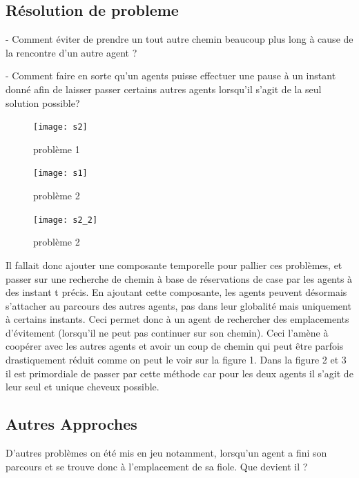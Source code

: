 \documentclass{article}
\begin{document}
\subsection{Résolution de probleme}


 - Comment éviter de prendre un tout autre chemin beaucoup plus long à cause de la rencontre d’un autre agent ?

 - Comment faire en sorte qu’un agents puisse effectuer une pause à un instant donné afin de laisser passer certains autres agents lorsqu'il s'agit de la seul solution possible?


\begin{figure}[h]
   \begin{minipage}{0.5\textwidth}
     \centering
     \texttt{[image: s2]}
     \caption{problème 1 }\label{Fig:1}
   \end{minipage}\hfill
   \begin{minipage}{0.5\textwidth}
     \centering
     \texttt{[image: s1]}
     \caption{problème 2}\label{Fig:2}
     \end{minipage}
\end{figure}

\begin{figure}[h]
     \centering
     \texttt{[image: s2\_2]}
     \caption{problème 2}\label{Fig:3}
\end{figure}
Il fallait donc ajouter une composante temporelle pour pallier ces problèmes, et passer sur une recherche de chemin à base de réservations de case par les  agents à des instant t précis. En ajoutant cette composante, les agents peuvent désormais s’attacher au parcours des autres agents, pas dans leur globalité mais uniquement à certains instants. Ceci permet donc à un agent de rechercher des emplacements d’évitement (lorsqu’il ne peut pas continuer sur son chemin). Ceci l'amène à coopérer avec les autres agents et avoir un coup de chemin qui peut être parfois drastiquement réduit comme on peut le voir sur la figure 1. Dans la figure 2 et 3 il est primordiale de passer par cette méthode car pour les deux agents il s'agit de leur seul et unique cheveux possible.
\\

\newpage

\subsection{Autres Approches}
D’autres problèmes on été mis en jeu notamment, lorsqu’un agent a fini son parcours et se trouve donc à l’emplacement de sa fiole. Que devient il ?\\
\end{document}

